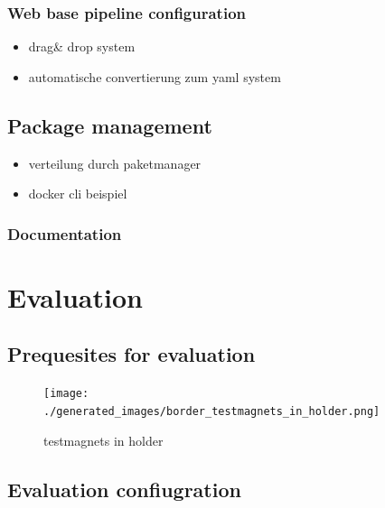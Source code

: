\hypertarget{web-base-pipeline-configuration}{%
\subsection{Web base pipeline
configuration}\label{web-base-pipeline-configuration}}

\begin{itemize}
\tightlist
\item
  drag\& drop system
\item
  automatische convertierung zum yaml system
\end{itemize}

\hypertarget{package-management}{%
\section{Package management}\label{package-management}}

\begin{itemize}
\tightlist
\item
  verteilung durch paketmanager
\item
  docker cli beispiel
\end{itemize}

\hypertarget{documentation}{%
\subsection{Documentation}\label{documentation}}

\hypertarget{evaluation}{%
\chapter{Evaluation}\label{evaluation}}

\hypertarget{prequesites-for-evaluation}{%
\section{Prequesites for evaluation}\label{prequesites-for-evaluation}}

\begin{figure}
\centering
\texttt{[image: ./generated\_images/border\_testmagnets\_in\_holder.png]}
\caption{testmagnets in holder \label{testmagnets_in_holder.png}}
\end{figure}

\hypertarget{evaluation-confiugration}{%
\section{Evaluation confiugration}\label{evaluation-confiugration}}


